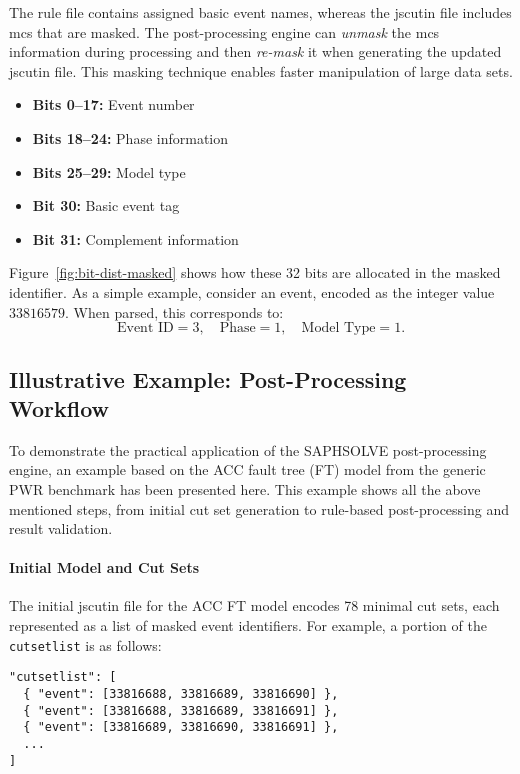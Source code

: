 The rule file contains assigned basic event names, whereas the \acrshort{jscutin} file includes \acrshort{mcs} that are masked. The post-processing engine can \emph{unmask} the \acrshort{mcs} information during processing and then \emph{re-mask} it when generating the updated \acrshort{jscutin} file. This masking technique enables faster manipulation of large data sets.

\begin{itemize}
    \item \textbf{Bits 0--17:} Event number
    \item \textbf{Bits 18--24:} Phase information
    \item \textbf{Bits 25--29:} Model type
    \item \textbf{Bit 30:} Basic event tag
    \item \textbf{Bit 31:} Complement information
\end{itemize}

\noindent Figure~\ref{fig:bit-dist-masked} shows how these 32 bits are allocated in the masked identifier. As a simple example, consider an event, encoded as the integer value \(\displaystyle 33816579\). When parsed, this corresponds to: \[
\text{Event ID} = 3, \quad
\text{Phase} = 1, \quad
\text{Model Type} = 1.
\]



\subsection{Illustrative Example: Post-Processing Workflow}
\label{sec:postproc-example}

To demonstrate the practical application of the SAPHSOLVE post-processing engine, an example based on the ACC fault tree (FT) model from the generic PWR benchmark has been presented here. This example shows all the above mentioned steps, from initial cut set generation to rule-based post-processing and result validation.

\paragraph{Initial Model and Cut Sets}

The initial \acrshort{jscutin} file for the ACC FT model encodes 78 minimal cut sets, each represented as a list of masked event identifiers. For example, a portion of the \texttt{cutsetlist} is as follows:

\begin{verbatim}
"cutsetlist": [
  { "event": [33816688, 33816689, 33816690] },
  { "event": [33816688, 33816689, 33816691] },
  { "event": [33816689, 33816690, 33816691] },
  ...
]
\end{verbatim}

